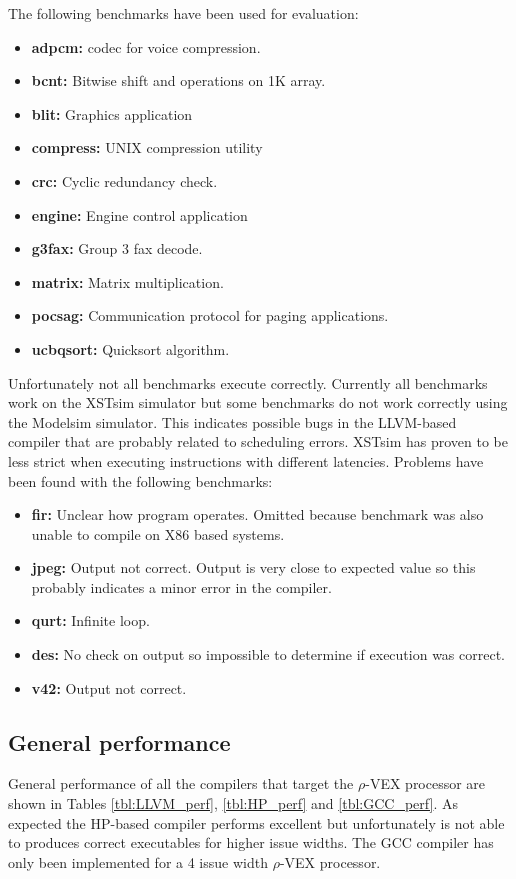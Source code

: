 The following benchmarks have been used for evaluation:

\begin{itemize}
	\item \textbf{adpcm:} codec for voice compression.
	\item \textbf{bcnt:} Bitwise shift and operations on 1K array.
	\item \textbf{blit:} Graphics application
	\item \textbf{compress:} UNIX compression utility
	\item \textbf{crc:} Cyclic redundancy check.
	\item \textbf{engine:} Engine control application
	\item \textbf{g3fax:} Group 3 fax decode.
	\item \textbf{matrix:} Matrix multiplication.
	\item \textbf{pocsag:} Communication protocol for paging applications.
	\item \textbf{ucbqsort:} Quicksort algorithm.
\end{itemize}

Unfortunately not all benchmarks execute correctly. Currently all benchmarks work on the XSTsim simulator but some benchmarks do not work correctly using the Modelsim simulator. This indicates possible bugs in the LLVM-based compiler that are probably related to scheduling errors. XSTsim has proven to be less strict when executing instructions with different latencies. Problems have been found with the following benchmarks:

\begin{itemize}
	\item \textbf{fir:} Unclear how program operates. Omitted because benchmark was also unable to compile on X86 based systems.
	\item \textbf{jpeg:} Output not correct. Output is very close to expected value so this probably indicates a minor error in the compiler.
	\item \textbf{qurt:} Infinite loop.
	\item \textbf{des:} No check on output so impossible to determine if execution was correct.
	\item \textbf{v42:} Output not correct.
\end{itemize}

\subsection{General performance}
General performance of all the compilers that target the $\rho$-VEX processor are shown in Tables \ref{tbl:LLVM_perf}, \ref{tbl:HP_perf} and \ref{tbl:GCC_perf}. As expected the HP-based compiler performs excellent but unfortunately is not able to produces correct executables for higher issue widths. The GCC compiler has only been implemented for a 4 issue width $\rho$-VEX processor.

